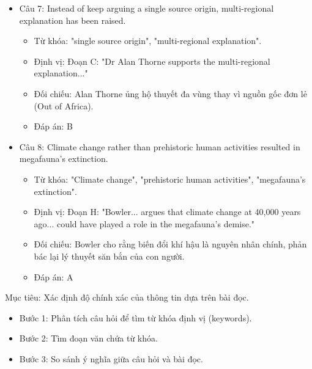 \documentclass{../templateReading/cdreading}
\begin{document}
\begin{itemize}
\begin{itemize}
\item Đối chiếu: "Proponent" đồng nghĩa với "supporter". Lý thuyết "blitzkrieg of hunting" tương ứng với việc săn bắn dẫn đến tuyệt chủng.
\item Đáp án: D
\end{itemize}
\item Câu 7: Instead of keep arguing a single source origin, multi-regional explanation has been raised.
\begin{itemize}
\item Từ khóa: "single source origin", "multi-regional explanation".
\item Định vị: Đoạn C: "Dr Alan Thorne supports the multi-regional explanation..."
\item Đối chiếu: Alan Thorne ủng hộ thuyết đa vùng thay vì nguồn gốc đơn lẻ (Out of Africa).
\item Đáp án: B
\end{itemize}
\item Câu 8: Climate change rather than prehistoric human activities resulted in megafauna’s extinction.
\begin{itemize}
\item Từ khóa: "Climate change", "prehistoric human activities", "megafauna’s extinction".
\item Định vị: Đoạn H: "Bowler... argues that climate change at 40,000 years ago... could have played a role in the megafauna’s demise."
\item Đối chiếu: Bowler cho rằng biến đổi khí hậu là nguyên nhân chính, phản bác lại lý thuyết săn bắn của con người.
\item Đáp án: A
\end{itemize}
\end{itemize}


Mục tiêu: Xác định độ chính xác của thông tin dựa trên bài đọc.

\begin{itemize}
\item Bước 1: Phân tích câu hỏi để tìm từ khóa định vị (keywords).
\item Bước 2: Tìm đoạn văn chứa từ khóa.
\item Bước 3: So sánh ý nghĩa giữa câu hỏi và bài đọc.
\end{itemize}
\end{document}
